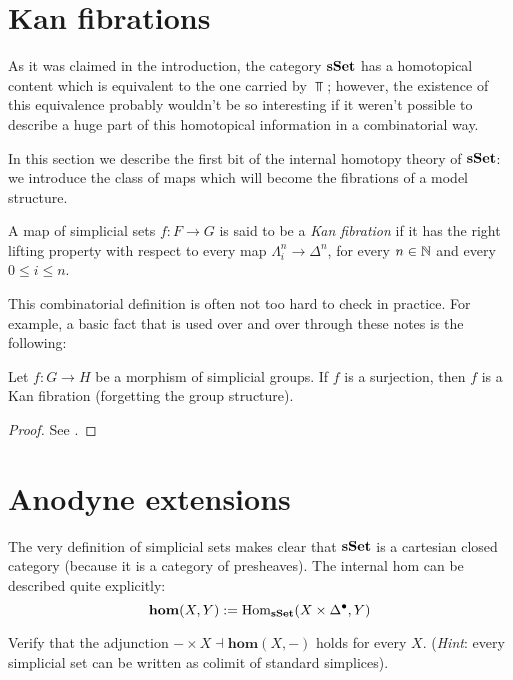 \begin{refsection}
\section{Kan fibrations}

As it was claimed in the introduction, the category $\mathbf{s\,\!\mathbf{Set}}$ has a homotopical content which is equivalent to the one carried by $\Top$; however, the existence of this equivalence probably wouldn't be so interesting if it weren't possible to describe a huge part of this homotopical information in a combinatorial way.

In this section we describe the first bit of the internal homotopy theory of $\mathbf{s\,\!\mathbf{Set}}$: we introduce the class of maps which will become the fibrations of a model structure.

\begin{defin} \label{def kan fibration}
A map of simplicial sets $f \colon F \to G$ is said to be a \emph{Kan fibration} if it has the right lifting property with respect to every map $\Lambda^n_i \to \Delta^n$, for every $n \in \mathbb{N}$ and every $0 \le i \le n$.
\end{defin}

This combinatorial definition is often not too hard to check in practice. For example, a basic fact that is used over and over through these notes is the following:

\begin{lemma} \label{lemma group fibration}
Let $f \colon G \to H$ be a morphism of simplicial groups. If $f$ is a surjection, then $f$ is a Kan fibration (forgetting the group structure).
\end{lemma}

\begin{proof}
See \cite[Lemma 8.2.8]{weibel}.
\end{proof}

\section{Anodyne extensions}

The very definition of simplicial sets makes clear that $\mathbf{s\,\!\mathbf{Set}}$ is a cartesian closed category (because it is a category of presheaves). The internal hom can be described quite explicitly:
\[
\mathbf{hom}(X,Y) := \mathrm{Hom}_{\mathbf{s\,\!\mathbf{Set}}}(X \times \Delta^{\bullet}, Y)
\]

\begin{exercise}
Verify that the adjunction $- \times X \dashv \mathbf{hom}(X,-)$ holds for every $X$. (\emph{Hint}: every simplicial set can be written as colimit of standard simplices).
\end{exercise}


\end{refsection}

